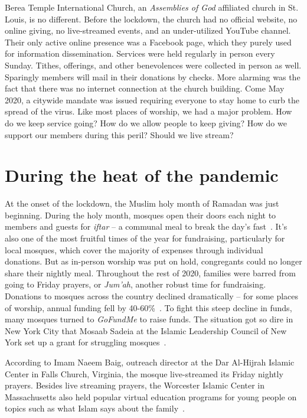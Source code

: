 Berea Temple International Church, an \textit{Assemblies of God} affiliated church in St. Louis, is no different. Before the lockdown, the church had no official website, no online giving, no live-streamed events, and an under-utilized YouTube channel. Their only active online presence was a Facebook page, which they purely used for information dissemination. Services were held regularly in person every Sunday. Tithes, offerings, and other benevolences were collected in person as well. Sparingly members will mail in their donations by checks. More alarming was the fact that there was no internet connection at the church building. Come May 2020, a citywide mandate was issued requiring everyone to stay home to curb the spread of the virus. Like most places of worship, we had a major problem. How do we keep service going? How do we allow people to keep giving? How do we support our members during this peril? Should we live stream?  

\section{During the heat of the pandemic}
At the onset of the lockdown, the Muslim holy month of Ramadan was just beginning. During the holy month, mosques open their doors each night to members and guests for \textit{iftar} – a communal meal to break the day’s fast~\cite{mulvey}. It’s also one of the most fruitful times of the year for fundraising, particularly for local mosques, which cover the majority of expenses through individual donations. But as in-person worship was put on hold, congregants could no longer share their nightly meal. Throughout the rest of 2020, families were barred from going to Friday prayers, or \textit{Jum’ah}, another robust time for fundraising. Donations to mosques across the country declined dramatically – for some places of worship, annual funding fell by 40-60\%~\cite{mulvey}. To fight this steep decline in funds, many mosques turned to \textit{GoFundMe} to raise funds. The situation got so dire in New York City that Mosaab Sadeia at the Islamic Leadership Council of New York set up a grant for struggling mosques~\cite{mulvey}. 

According to Imam Naeem Baig, outreach director at the Dar Al-Hijrah Islamic Center in Falls Church, Virginia, the mosque live-streamed its Friday nightly prayers. Besides live streaming prayers, the Worcester Islamic Center in Massachusetts also held popular virtual education programs for young people on topics such as what Islam says about the family~\cite{block}.

